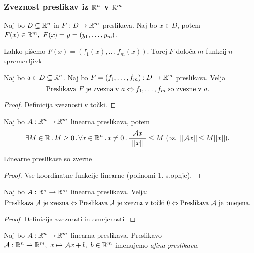 \newpage
\subsubsection{Zveznost preslikav iz $\mathbb{R}^n$ v $\mathbb{R}^m$}
Naj bo $D \subseteq \mathbb{R}^n$ in $F: D \to \mathbb{R}^m$ preslikava. Naj bo $x \in D$, potem $F(x) \in \mathbb{R}^m, \ F(x) = y = (y_1, \ldots, y_m)$.

Lahko pišemo $F(x) = (f_1(x), \ldots, f_m(x))$. Torej $F$ določa $m$ funkcij $n$-spremenljivk.

\begin{trditev}
    Naj bo $a \in D \subseteq \mathbb{R}^n$. Naj bo $F=(f_1, \ldots, f_m): D \to \mathbb{R}^m$ preslikava. Velja:
    $$\text{Preslikava } F \text{ je zvezna v } a \Leftrightarrow f_1,\ldots, f_m \text{ so zvezne v } a.$$
\end{trditev}

\begin{proof}
    Definicija zveznosti v točki.
\end{proof}

\begin{zgled}
    Naj bo $\mathcal{A}: \mathbb{R}^n \to \mathbb{R}^m$ linearna preslikava, potem $$\exists  M \in \mathbb{R} \, . \, M \geq 0 \,.\, \forall x \in \mathbb{R}^n \, . \, x \neq 0  \,.\,  \frac{||\mathcal{A}x||}{||x||} \leq M \ (\text{oz. } ||\mathcal{A}x|| \leq M ||x|| ).$$
\end{zgled}

\begin{trditev}
    Linearne preslikave so zvezne
\end{trditev}

\begin{proof}
    Vse koordinatne funkcije linearne (polinomi 1. stopnje).
\end{proof}

\begin{trditev}
    Naj bo $\mathcal{A}: \mathbb{R}^n \to \mathbb{R}^m$ linearna preslikava. Velja:
    $$\text{Preslikava } \mathcal{A} \text{ je zvezna} \Leftrightarrow \text{Preslikava } \mathcal{A} \text{ je zvezna v točki } 0 \Leftrightarrow \text{Preslikava } \mathcal{A} \text{ je omejena}.$$
\end{trditev}

\begin{proof}
    Definicija zveznosti in omejenosti.
\end{proof}

\begin{definicija}
    Naj bo $\mathcal{A}: \mathbb{R}^n \to \mathbb{R}^m$ linearna preslikava. Preslikavo $\mathcal{A}: \mathbb{R}^n \to \mathbb{R}^m, \ x \mapsto \mathcal{A}x + b, \ b \in \mathbb{R}^m$ imenujemo \emph{afina preslikava}.
\end{definicija}

